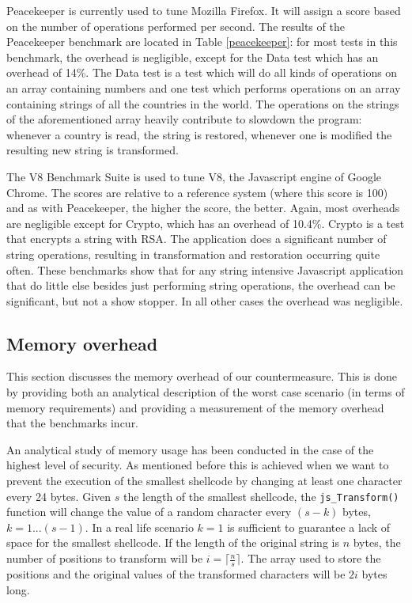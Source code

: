 Peacekeeper is currently used to tune Mozilla Firefox. It will assign a score based on the number of operations performed per second. The results of the Peacekeeper benchmark are located in Table \ref{peacekeeper}: for most tests in this benchmark, the overhead is negligible, except for the Data test which has an overhead of 14\%. The Data test is a test which will do all kinds of operations on an array containing numbers and one test which performs operations on an array containing strings of all the countries in the world. The operations on the strings of the aforementioned array heavily contribute to slowdown the program: whenever a country is read, the string is restored, whenever one is modified the resulting new string is transformed.

The V8 Benchmark Suite is used to tune V8, the Javascript engine of Google Chrome. The scores are relative to a reference system (where this score is 100) and as with Peacekeeper, the higher the score, the better. Again, most overheads are negligible except for Crypto, which has an overhead of 10.4\%. Crypto is a test that encrypts a string with RSA. The application does a significant number of string operations, resulting in transformation and restoration occurring quite often.
These benchmarks show that for any string intensive Javascript application that do little else besides just performing string operations, the overhead can be significant, but not a show stopper. In all other cases the overhead was negligible.

\subsection{Memory overhead} \label{anal}
This section discusses the memory overhead of our countermeasure. This is done by providing both an analytical description of the worst case scenario (in terms of memory requirements) and providing a measurement of the memory overhead that the benchmarks incur.

An analytical study of memory usage has been conducted in the case of the highest level of security. As mentioned before this is achieved when we want to prevent the execution of the smallest shellcode by changing at least one character every 24 bytes. 
Given $s$ the length of the smallest shellcode, the \texttt{js\_Transform()} function will change the value of a random character every $(s-k)$ bytes, $k=1...(s-1)$. In a real life scenario $k=1$ is sufficient to guarantee a lack of space for the smallest shellcode. If the length of the original string is $n$ bytes, the number of positions to transform will be $i = \lceil \frac{n}{s} \rceil$. The array used to store the positions and the original values of the transformed characters will be $2i$ bytes long.

